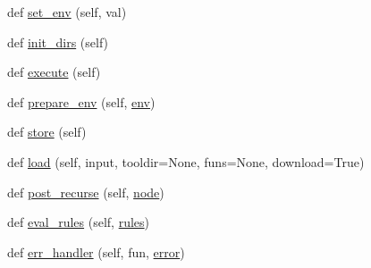 \begin{DoxyCompactItemize}
def \hyperlink{classwaflib_1_1_configure_1_1_configuration_context_ad30b269279dd9c24e6d892bb3b2fc583}{set\+\_\+env} (self, val)
\item 
def \hyperlink{classwaflib_1_1_configure_1_1_configuration_context_a782925b68e221c10f8e08433329364c9}{init\+\_\+dirs} (self)
\item 
def \hyperlink{classwaflib_1_1_configure_1_1_configuration_context_a2dadcc441cc31bb49159c709bae0ec32}{execute} (self)
\item 
def \hyperlink{classwaflib_1_1_configure_1_1_configuration_context_a913063288a6135c3105acf180e7f0f0c}{prepare\+\_\+env} (self, \hyperlink{classwaflib_1_1_configure_1_1_configuration_context_a390267f6d3529fe07447ffb4925ca533}{env})
\item 
def \hyperlink{classwaflib_1_1_configure_1_1_configuration_context_aadaed27da973f44dde6eaa890026be35}{store} (self)
\item 
def \hyperlink{classwaflib_1_1_configure_1_1_configuration_context_ae13e6fac1db3060edb50337f97b7be3f}{load} (self, input, tooldir=None, funs=None, download=True)
\item 
def \hyperlink{classwaflib_1_1_configure_1_1_configuration_context_a9620736938604c56dc26964b06a24e2e}{post\+\_\+recurse} (self, \hyperlink{structnode}{node})
\item 
def \hyperlink{classwaflib_1_1_configure_1_1_configuration_context_af1b5fdd6d958f8b996dba916c44ec9fa}{eval\+\_\+rules} (self, \hyperlink{classwaflib_1_1_configure_1_1_configuration_context_a279ad5a7c2630c4416afc36cad85a2db}{rules})
\item 
def \hyperlink{classwaflib_1_1_configure_1_1_configuration_context_acc349b079382fdac3d626eb46bd54b7e}{err\+\_\+handler} (self, fun, \hyperlink{sndfile__save_8m_ada4b423bc19e6ff5c5b514e55f518a82}{error})
\end{DoxyCompactItemize}
